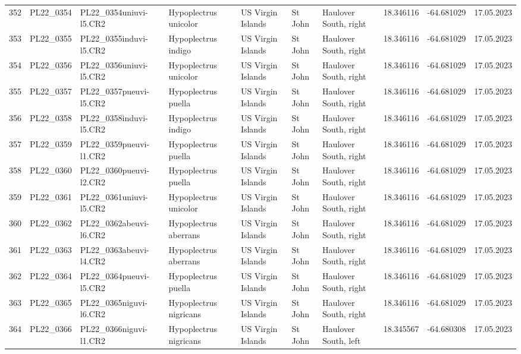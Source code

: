 \begin{table}[ht]
\begin{tabular}{rlllllllll}
  352 & PL22\_0354 & PL22\_0354uniuvi-l5.CR2 & Hypoplectrus unicolor & US Virgin Islands & St John & Haulover South, right & 18.346116 & -64.681029 & 17.05.2023 \\ 
  353 & PL22\_0355 & PL22\_0355induvi-l5.CR2 & Hypoplectrus indigo & US Virgin Islands & St John & Haulover South, right & 18.346116 & -64.681029 & 17.05.2023 \\ 
  354 & PL22\_0356 & PL22\_0356uniuvi-l5.CR2 & Hypoplectrus unicolor & US Virgin Islands & St John & Haulover South, right & 18.346116 & -64.681029 & 17.05.2023 \\ 
  355 & PL22\_0357 & PL22\_0357pueuvi-l5.CR2 & Hypoplectrus puella & US Virgin Islands & St John & Haulover South, right & 18.346116 & -64.681029 & 17.05.2023 \\ 
  356 & PL22\_0358 & PL22\_0358induvi-l5.CR2 & Hypoplectrus indigo & US Virgin Islands & St John & Haulover South, right & 18.346116 & -64.681029 & 17.05.2023 \\ 
  357 & PL22\_0359 & PL22\_0359pueuvi-l1.CR2 & Hypoplectrus puella & US Virgin Islands & St John & Haulover South, right & 18.346116 & -64.681029 & 17.05.2023 \\ 
  358 & PL22\_0360 & PL22\_0360pueuvi-l2.CR2 & Hypoplectrus puella & US Virgin Islands & St John & Haulover South, right & 18.346116 & -64.681029 & 17.05.2023 \\ 
  359 & PL22\_0361 & PL22\_0361uniuvi-l5.CR2 & Hypoplectrus unicolor & US Virgin Islands & St John & Haulover South, right & 18.346116 & -64.681029 & 17.05.2023 \\ 
  360 & PL22\_0362 & PL22\_0362abeuvi-l6.CR2 & Hypoplectrus aberrans & US Virgin Islands & St John & Haulover South, right & 18.346116 & -64.681029 & 17.05.2023 \\ 
  361 & PL22\_0363 & PL22\_0363abeuvi-l4.CR2 & Hypoplectrus aberrans & US Virgin Islands & St John & Haulover South, right & 18.346116 & -64.681029 & 17.05.2023 \\ 
  362 & PL22\_0364 & PL22\_0364pueuvi-l5.CR2 & Hypoplectrus puella & US Virgin Islands & St John & Haulover South, right & 18.346116 & -64.681029 & 17.05.2023 \\ 
  363 & PL22\_0365 & PL22\_0365niguvi-l6.CR2 & Hypoplectrus nigricans & US Virgin Islands & St John & Haulover South, right & 18.346116 & -64.681029 & 17.05.2023 \\ 
  364 & PL22\_0366 & PL22\_0366niguvi-l1.CR2 & Hypoplectrus nigricans & US Virgin Islands & St John & Haulover South, left & 18.345567 & -64.680308 & 17.05.2023 \\ 

\end{tabular}
\end{table}
